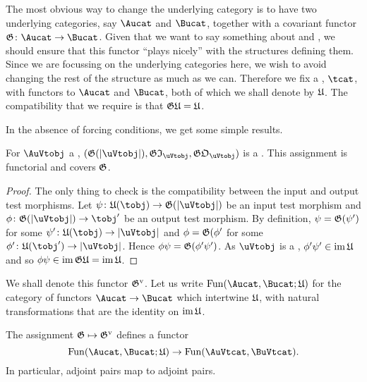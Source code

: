 \documentclass[%
12pt,%
arxiv,%
defaults
]{myclass}
\begin{document}
The most obvious way to change the underlying category is to have two underlying categories, say \(\Aucat\) and \(\Bucat\), together with a covariant functor \(\subfunc \colon \Aucat \to \Bucat\).
Given that we want to say something about \uVtobjs and \uFVtobjs, we should ensure that this functor ``plays nicely'' with the structures defining them.
Since we are focussing on the underlying categories here, we wish to avoid changing the rest of the structure as much as we can.
Therefore we fix a \tcat, \(\tcat\), with functors to \(\Aucat\) and \(\Bucat\), both of which we shall denote by \(\ufunc\).
The compatibility that we require is that \(\subfunc \ufunc = \ufunc\).

In the absence of forcing conditions, we get some simple results.

\begin{proposition}
For \(\AuVtobj\) a \AuVtobj, \((\subfunc(\forfunc[\uVtobj]), \subfunc \itest_{\uVtobj}, \subfunc \otest_{\uVtobj})\) is a \BuVtobj.
This assignment is functorial and covers \(\subfunc\).
\end{proposition}

\begin{proof}
The only thing to check is the compatibility between the input and output test morphisms.
Let \(\ifn \colon \ufunc(\tobj) \to \subfunc(\forfunc[\uVtobj])\) be an input test morphism and \(\ofn \colon \subfunc(\forfunc[\uVtobj]) \to \tobj'\) be an output test morphism.
By definition, \(\ifn = \subfunc(\ifn')\) for some \(\ifn' \colon \ufunc(\tobj) \to \forfunc[\uVtobj]\) and \(\ofn = \subfunc(\ofn'\) for some \(\ofn' \colon \ufunc(\tobj') \to \forfunc[\uVtobj]\).
Hence \(\ofn \ifn = \subfunc(\ofn' \ifn')\).
As \(\uVtobj\) is a \uVtobj, \(\ofn' \ifn' \in \im \ufunc\) and so \(\ofn \ifn \in \im \subfunc \ufunc = \im \ufunc\).
\end{proof}

We shall denote this functor \(\mVo{\subfunc}\).
Let us write \(\Fun(\Aucat, \Bucat; \ufunc)\) for the category of functors \(\Aucat \to \Bucat\) which intertwine \(\ufunc\), with natural transformations that are the identity on \(\im \ufunc\).

\begin{corollary}
The assignment \(\subfunc \mapsto \mVo{\subfunc}\) defines a functor
%
\[
  \Fun(\Aucat, \Bucat; \ufunc) \to \Fun(\AuVtcat, \BuVtcat).
\]
%
In particular, adjoint pairs map to adjoint pairs. \noproof
\end{corollary}
\end{document}
